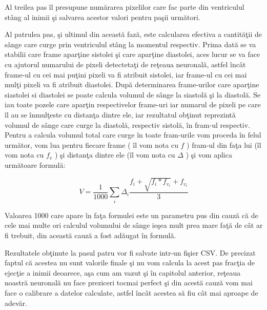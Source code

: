 \par

Al treilea pas \^{i}l presupune num\u{a}rarea pixelilor care fac parte din ventriculul st\^{a}ng al inimii \c{s}i salvarea acestor valori pentru pa\c{s}ii urm\u{a}tori.

\par 

Al patrulea pas, \c{s}i ultimul din aceast\u{a} faz\u{a}, este calcularea efectiva a cantit\u{a}\c{t}ii de s\^{a}nge care curge prin ventriculul st\^{a}ng la momentul respectiv. Prima dat\u{a} se va stabilii care frame apar\c{t}ine sistolei \c{s}i care apar\c{t}ine diastolei, aces lucur se va face cu ajutorul numarului de pixeli detecteta\c{t}i de re\c{t}eaua neuronal\u{a}, astfel \^{i}nc\^{a}t frame-ul cu cei mai pu\c{t}ini pixeli va fi atribuit  sistolei, iar frame-ul cu cei mai mul\c{t}i pixeli va fi atribuit diastolei. Dup\u{a} determinarea frame-urilor care apar\c{t}ine siastolei si diastolei se poate calcula volumul de s\^{a}nge la siastol\u{a} \c{s}i la diastol\u{a}. Se iau toate pozele care apar\c{t}in respectivelor frame-uri iar numarul de pixeli pe care \^{i}l au se \^{i}nmul\c{t}este cu distan\c{t}a dintre ele, iar rezultatul ob\c{t}inut reprezint\u{a} volumul de s\^{a}nge care curge la diastol\u{a}, respectiv sistol\u{a}, \^{i}n fram-ul respectiv. Pentru a calcula volumul total care curge \^{i}n toate fram-urile vom proceda \^{i}n felul urm\u{a}tor, vom lua pentru fiecare frame ( \^{i}l vom nota cu $f$ ) fram-ul din fa\c{t}a lui (\^{i}l vom nota cu $f_v$ ) \c{s}i distan\c{t}a dintre ele (\^{i}l vom nota cu $\Delta$ ) \c{s}i vom aplica urm\u{a}toare formul\u{a}:

$$ V = \frac{1}{1000} \sum_i \Delta_i \frac{f_i + \sqrt{f_i * f_{v_i}} + f_{v_i}}{3} $$

Valoarea 1000 care apare \^{i}n fa\c{t}a formulei este un parametru pus din cauz\u{a} c\u{a} de cele mai multe ori calculul volumului de s\^{a}nge ie\c{s}ea mult prea mare fa\c{t}\u{a} de c\^{a}t ar fi trebuit, din aceast\u{a} cauz\u{a} a fost ad\u{a}ugat \^{i}n formul\u{a}.

\par

Rezultatele ob\c{t}inute la pasul patru vor fi salvate intr-un fi\c{s}ier CSV. De precizat faptul c\u{a} acestea nu sunt valorile finale \c{s}i nu vom calcula la acest pas frac\c{t}ia de ejec\c{t}ie a inimii deoarece, a\c{s}a cum am vazut \c{s}i \^{i}n capitolul anterior, re\c{t}eaua noastr\u{a} neuronal\u{a} nu face preziceri tocmai perfect \c{s}i din acest\u{a} cauz\u{a} vom mai face o calibrare a datelor calculate, astfel \^{i}nc\^{a}t acestea s\u{a} fiu c\^{a}t mai aproape de adev\u{a}r.


